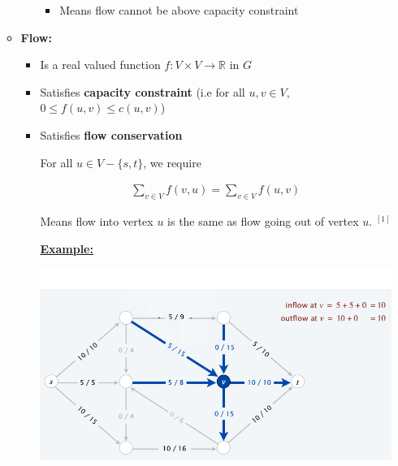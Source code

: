 \documentclass[12pt]{article}
\begin{document}
\begin{enumerate}[1.]
\begin{itemize}
\begin{itemize}
            \begin{itemize}
                \item Means flow cannot be above capacity constraint
            \end{itemize}
        \end{itemize}

        \item \textbf{Flow:}

        \begin{itemize}
            \item Is a real valued function $f: V \times V \to \mathbb{R}$ in $G$
            \item Satisfies \textbf{capacity constraint} (i.e for all $u,v \in V$, $0 \leq f(u,v) \leq c(u,v)$)
            \item Satisfies \textbf{flow conservation}

            \bigskip

            For all $u \in V - \{s,t\}$, we require

            \bigskip

            \begin{align}
            \sum\limits_{v \in V} f(v,u) = \sum\limits_{v \in V} f(u,v)
            \end{align}

            \bigskip

            Means flow into vertex $u$ is the same as flow going out of vertex $u$. $^{[1]}$

            \bigskip

            \underline{\textbf{Example:}}

            \begin{center}
            \includegraphics[width=0.9\linewidth]{images/worksheet_5_solution_4.png}
            \end{center}



\end{itemize}
\end{itemize}
\end{enumerate}
\end{document}
